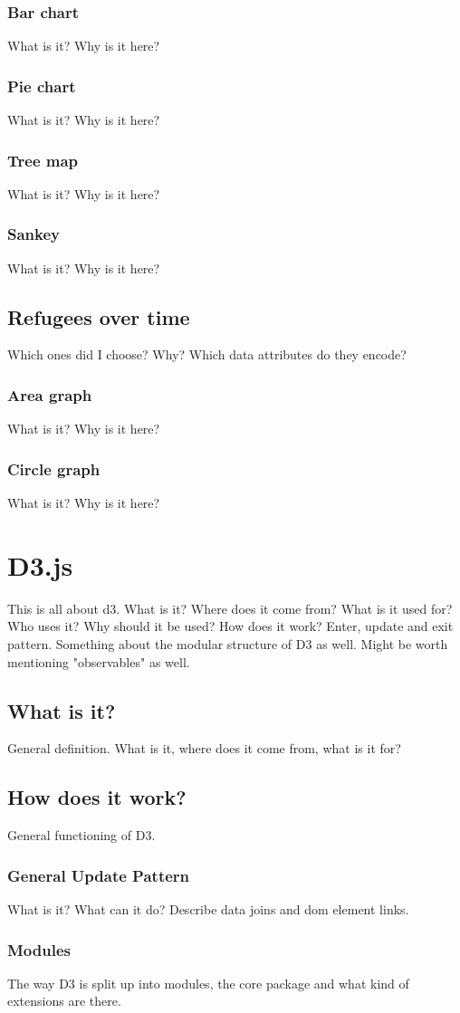 \subsubsection{Bar chart}
What is it? Why is it here?

\subsubsection{Pie chart}
What is it? Why is it here?

\subsubsection{Tree map}
What is it? Why is it here?

\subsubsection{Sankey}
What is it? Why is it here?

\subsection{Refugees over time}
Which ones did I choose? Why? Which data attributes do they encode?

\subsubsection{Area graph}
What is it? Why is it here?

\subsubsection{Circle graph}
What is it? Why is it here?


\section{D3.js}
This is all about d3. What is it? Where does it come from? What is it used for? Who uses it? Why should it be used? How does it work? Enter, update and exit pattern. Something about the modular structure of D3 as well. Might be worth mentioning "observables" as well.

\subsection{What is it?}
General definition. What is it, where does it come from, what is it for?

\subsection{How does it work?}
General functioning of D3.

\subsubsection{General Update Pattern}
What is it? What can it do? Describe data joins and dom element links.

\subsubsection{Modules}
The way D3 is split up into modules, the core package and what kind of extensions are there.
